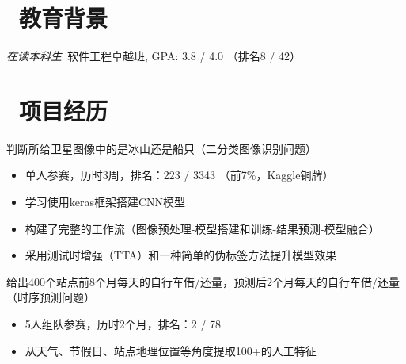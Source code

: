 \documentclass{resume}
\begin{document}


 
\section{\faGraduationCap\ 教育背景}
\textit{在读本科生}\ 软件工程卓越班, GPA: 3.8 / 4.0 （排名8 / 42）

\section{\faUsers\ 项目经历}

\begin{onehalfspacing}
判断所给卫星图像中的是冰山还是船只（二分类图像识别问题）
\begin{itemize}
  \item 单人参赛，历时3周，排名：223 / 3343 （前7\%，Kaggle铜牌）
  \item 学习使用keras框架搭建CNN模型
  \item 构建了完整的工作流（图像预处理-模型搭建和训练-结果预测-模型融合）
  \item 采用测试时增强（TTA）和一种简单的伪标签方法提升模型效果
\end{itemize}
\end{onehalfspacing}

\begin{onehalfspacing}
给出400个站点前8个月每天的自行车借/还量，预测后2个月每天的自行车借/还量（时序预测问题）
\begin{itemize}
  \item 5人组队参赛，历时2个月，排名：2 / 78
  \item 从天气、节假日、站点地理位置等角度提取100+的人工特征
\end{itemize}
\end{onehalfspacing}

\end{document}
